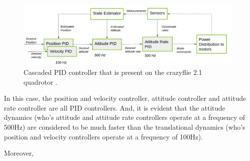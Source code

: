 \documentclass{thesisreport}
\begin{document}

\begin{figure}[h]
	\centering
	\includegraphics[width=\textwidth]{Images/Control/cascaded_pid_controller.png}
	\caption{Cascaded PID controller that is present on the crazyflie 2.1 quadrotor \cite{bitcraze}.}
	\label{fig:cascaded_pid_controller}
\end{figure}

In this case, the position and velocity controller, attitude controller and attitude rate controller are all PID controllers. And, it is evident that the attitude dynamics (who's attitude and attitude rate controllers operate at a frequency of 500Hz) are considered to be much faster than the translational dynamics (who's position and velocity controllers operate at a frequency of 100Hz). 

\newpage

Moreover, 
\end{document}
